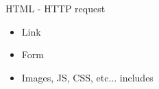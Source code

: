 \begin{frame}{HTML - HTTP request}
 \begin{center}
 \begin{itemize}
 \item Link
 \item Form
 \item Images, JS, CSS, etc... includes
 \end{itemize}
 \end{center}
\end{frame}